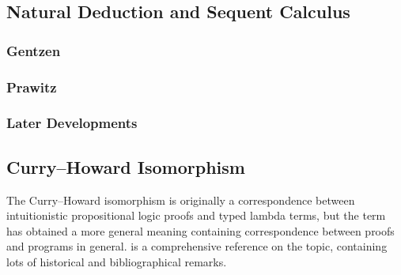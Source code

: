 \subsection{Natural Deduction and Sequent Calculus}

\subsubsection{Gentzen}


\subsubsection{Prawitz}

\subsubsection{Later Developments}

\subsection{Curry--Howard Isomorphism}

The Curry--Howard isomorphism is originally a correspondence between
intuitionistic propositional logic proofs and typed lambda terms, but
the term has obtained a more general meaning containing
correspondence between proofs and programs in general.
\citet{curryhoward} is a comprehensive reference on the topic,
containing lots of historical and bibliographical remarks.

